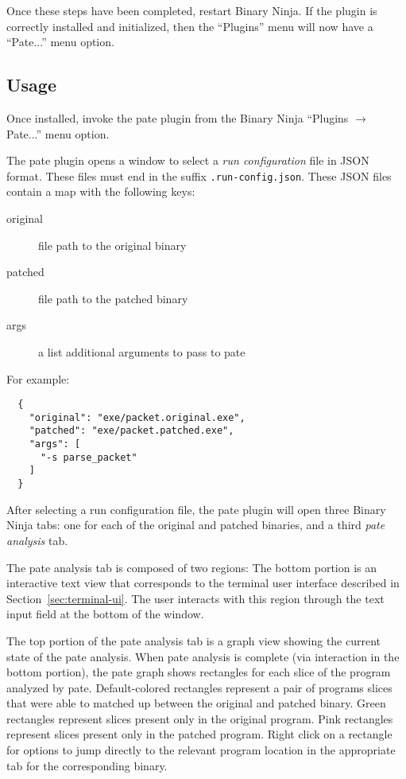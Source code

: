 Once these steps have been completed, restart Binary Ninja.
If the plugin is correctly installed and initialized, then the ``Plugins'' menu will now have a ``Pate...'' menu option.

\subsection{Usage}

Once installed, invoke the pate plugin from the Binary Ninja ``Plugins $\rightarrow$ Pate...'' menu option.

The pate plugin opens a window to select a \emph{run configuration} file in JSON format.
These files must end in the suffix \texttt{.run-config.json}.
These JSON files contain a map with the following keys:
\begin{description}
    \item[original] file path to the original binary
    \item[patched] file path to the patched binary
    \item[args] a list additional arguments to pass to pate
\end{description}

For example:

\begin{verbatim}
  {
    "original": "exe/packet.original.exe",
    "patched": "exe/packet.patched.exe",
    "args": [
      "-s parse_packet"
    ]
  }
\end{verbatim}

After selecting a run configuration file, the pate plugin will open three Binary Ninja tabs: one for each of the original and patched binaries, and a third \emph{pate analysis} tab.

The pate analysis tab is composed of two regions:
The bottom portion is an interactive text view that corresponds to the terminal user interface described in Section~\ref{sec:terminal-ui}.
The user interacts with this region through the text input field at the bottom of the window.

The top portion of the pate analysis tab is a graph view showing the current state of the pate analysis.
When pate analysis is complete (via interaction in the bottom portion), the pate graph shows rectangles for each slice of the program analyzed by pate.
Default-colored rectangles represent a pair of programs slices that were able to matched up between the original and patched binary.
Green rectangles represent slices present only in the original program.
Pink rectangles represent slices present only in the patched program.
Right click on a rectangle for options to jump directly to the relevant program location in the appropriate tab for the corresponding binary.

